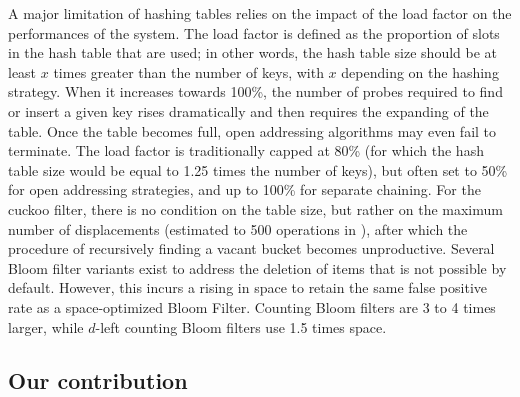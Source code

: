 \documentclass{llncs}
\newcounter{prob}
\begin{document}
A major limitation of hashing tables relies on the impact of the load factor on the performances of the system. The load factor is defined as the proportion of slots in the hash table that are used; in other words, the hash table size should be at least $x$ times greater than the number of keys, with $x$ depending on the hashing strategy. When it increases towards 100\%, the number of probes required to find or insert a given key rises dramatically and then requires the expanding of the table. Once the table becomes full, open addressing algorithms may even fail to terminate. The load factor is traditionally capped at 80\% (for which the hash table size would be equal to 1.25 times the number of keys), but often set to 50\% for open addressing strategies, and up to 100\% for separate chaining.
For the cuckoo filter, there is no condition on the table size, but rather on the maximum number of displacements (estimated to 500 operations in \cite{Fan2014}), after which the procedure of recursively finding a vacant bucket becomes unproductive. Several Bloom filter variants exist to address the deletion of items that is not possible by default. However, this incurs a rising in space to retain the same false positive rate as a space-optimized Bloom Filter. Counting Bloom filters \cite{Tarkoma2012} are 3 to 4 times larger, while $d$-left counting Bloom filters \cite{Bonomi2006} use 1.5 times space.

\subsection{Our contribution}


\end{document}
